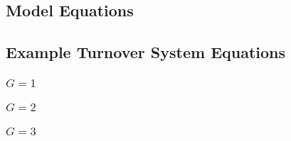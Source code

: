 \subsection{Model Equations}\label{aa:eqs-model}

\subsection{Example Turnover System Equations}\label{aa:eqs-turnover}
\subsubsection{$G = 1$}

\subsubsection{$G = 2$}

\subsubsection{$G = 3$}
